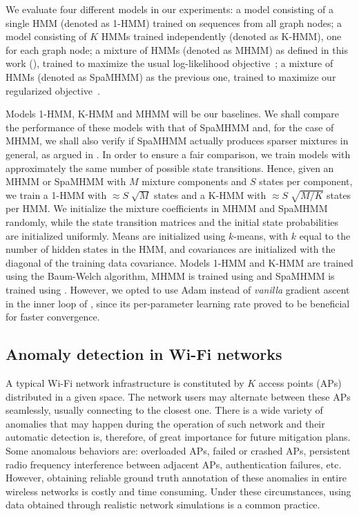 We evaluate four different models in our experiments: a model consisting of a single HMM (denoted as 1-HMM) trained on sequences from all graph nodes; a model consisting of $K$ HMMs trained independently (denoted as K-HMM), one for each graph node; a mixture of HMMs (denoted as MHMM) as defined in this work (), trained to maximize the usual log-likelihood objective~; a mixture of HMMs (denoted as SpaMHMM) as the previous one, trained to maximize our regularized objective~.

Models 1-HMM, K-HMM and MHMM will be our baselines. We shall compare the performance of these models with that of SpaMHMM and, for the case of MHMM, we shall also verify if SpaMHMM actually produces sparser mixtures in general, as argued in . In order to ensure a fair comparison, we train models with approximately the same number of possible state transitions. Hence, given an MHMM or SpaMHMM with $M$ mixture components and $S$ states per component, we train a 1-HMM with $\approx S\sqrt[]{M}$ states and a K-HMM with $\approx S\sqrt[]{M/K}$ states per HMM. We initialize the mixture coefficients in MHMM and SpaMHMM randomly, while the state transition matrices and the initial state probabilities are initialized uniformly. Means are initialized using $k$-means, with $k$ equal to the number of hidden states in the HMM, and covariances are initialized with the diagonal of the training data covariance. Models 1-HMM and K-HMM are trained using the Baum-Welch algorithm, MHMM is trained using  and SpaMHMM is trained using . However, we opted to use Adam \citet{Kingma2014} instead of \textit{vanilla} gradient ascent in the inner loop of , since its per-parameter learning rate proved to be beneficial for faster convergence.

\subsection{Anomaly detection in Wi-Fi networks}
\label{sec:wi_fi}
A typical Wi-Fi network infrastructure is constituted by $K$ access points (APs) distributed in a given space. The network users may alternate between these APs seamlessly, usually connecting to the closest one. There is a wide variety of anomalies that may happen during the operation of such network and their automatic detection is, therefore, of great importance for future mitigation plans. Some anomalous behaviors are: overloaded APs, failed or crashed APs, persistent radio frequency interference between adjacent APs, authentication failures, etc. However, obtaining reliable ground truth annotation of these anomalies in entire wireless networks is costly and time consuming. Under these circumstances, using data obtained through realistic network simulations is a common practice. 

